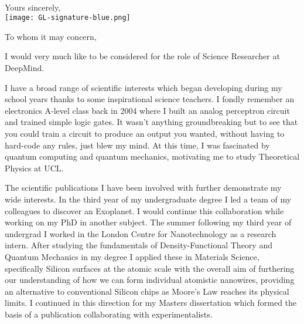 \documentclass[11pt,a4paper,sans]{moderncv}        %
\begin{document}

\clearpage
\recipient{~}{~}
\date{\vspace*{-0.5cm}~}
\opening{\vspace*{-3cm}~}
\closing{Yours sincerely, \\ \hspace*{-0.3cm}
\texttt{[image: GL-signature-blue.png]} 
\vspace*{-1cm}
}
\makelettertitle
%
To whom it may concern,
%

I would very much like to be considered for the role of Science Researcher at DeepMind.

%
I have a broad range of scientific interests
which began developing during my school years
thanks to some inspirational
science teachers.
%
I fondly remember an 
electronics A-level class back in 2004 where I 
built an analog perceptron circuit and trained 
simple logic gates. It wasn't anything groundbreaking 
but to see that you could train a circuit to produce 
an output you wanted, without having to hard-code 
any rules, just blew my mind. 
%
At this time, I was fascinated by quantum computing 
and quantum mechanics, motivating me to study 
Theoretical Physics at UCL.
%

The scientific publications I have been involved with further
demonstrate my wide interests. 
In the third year of my undergraduate degree I led a 
team of my colleagues to discover an 
Exoplanet\cite{habitable}. 
I would continue this collaboration\cite{exofit_mnras} 
while working on my PhD in another subject. 
The summer following my third year of undergrad 
I worked in the London Centre for Nanotechnology as a 
research intern. After studying the fundamentals 
of Density-Functional Theory and Quantum Mechanics in my 
degree I applied these in 
Materials Science, specifically Silicon surfaces at the 
atomic scale \cite{stm_aps} with the overall aim
of furthering our understanding of how we can form 
individual atomistic nanowires, providing an alternative
to conventional Silicon chips as Moore's Law
reaches its physical limits.
%
I continued in this direction for my Masters 
dissertation which formed the basis of a 
publication collaborating with
experimentalists\cite{prb_silicon}.
%
\end{document}
